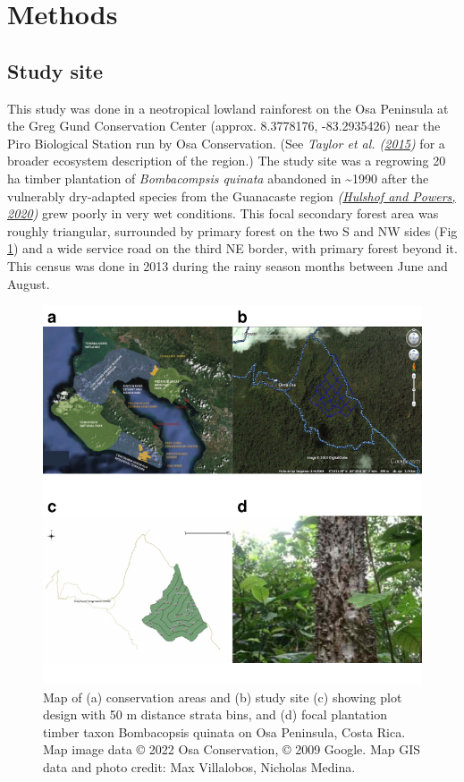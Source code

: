 \documentclass[
  12pt,
]{article}
\begin{document}
\hypertarget{methods}{%
\section{Methods}\label{methods}}

\hypertarget{study-site}{%
\subsection{Study site}\label{study-site}}

This study was done in a neotropical lowland rainforest on the Osa Peninsula at the Greg Gund Conservation Center (approx. 8.3778176, -83.2935426) near the Piro Biological Station run by Osa Conservation.
(See \emph{Taylor et al. (\protect\hyperlink{ref-taylor15}{2015})} for a broader ecosystem description of the region.)
The study site was a regrowing 20 ha timber plantation of \emph{Bombacompsis quinata} abandoned in \textasciitilde1990 after the vulnerably dry-adapted species from the Guanacaste region
\emph{(\protect\hyperlink{ref-hulshof20}{Hulshof and Powers, 2020})} grew poorly in very wet conditions.
This focal secondary forest area was roughly triangular, surrounded by primary forest on the two S and NW sides (Fig \ref{fig:map}) and a wide service road on the third NE border, with primary forest beyond it.
This census was done in 2013 during the rainy season months between June and August.

\begin{figure}
\centering
\includegraphics{merge_files/figure-latex/map-1.pdf}
\caption{\label{fig:map}Map of (a) conservation areas and (b) study site (c) showing plot design with 50 m distance strata bins, and (d) focal plantation timber taxon Bombacopsis quinata on Osa Peninsula, Costa Rica. Map image data © 2022 Osa Conservation, © 2009 Google. Map GIS data and photo credit: Max Villalobos, Nicholas Medina.}
\end{figure}
\end{document}

